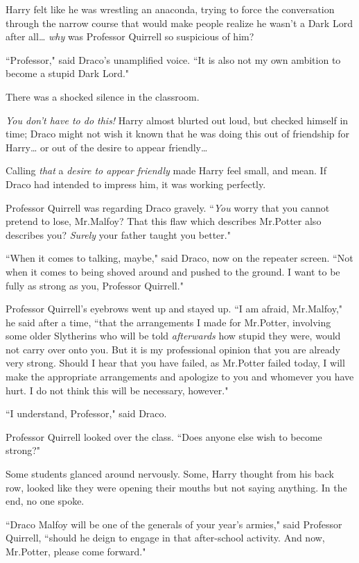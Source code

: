 Harry felt like he was wrestling an anaconda, trying to force the conversation through the narrow course that would make people realize he wasn't a Dark Lord after all{\ldots} \emph{why} was Professor Quirrell so suspicious of him?

``Professor," said Draco's unamplified voice. ``It is also not my own ambition to become a stupid Dark Lord."

There was a shocked silence in the classroom.

\emph{You don't have to do this!} Harry almost blurted out loud, but checked himself in time; Draco might not wish it known that he was doing this out of friendship for Harry{\ldots} or out of the desire to appear friendly{\ldots}

Calling \emph{that} a \emph{desire to appear friendly} made Harry feel small, and mean. If Draco had intended to impress him, it was working perfectly.

Professor Quirrell was regarding Draco gravely. ``\emph{You} worry that you cannot pretend to lose, Mr.\?Malfoy? That this flaw which describes Mr.\?Potter also describes you? \emph{Surely} your father taught you better."

``When it comes to talking, maybe," said Draco, now on the repeater screen. ``Not when it comes to being shoved around and pushed to the ground. I want to be fully as strong as you, Professor Quirrell."

Professor Quirrell's eyebrows went up and stayed up. ``I am afraid, Mr.\?Malfoy," he said after a time, ``that the arrangements I made for Mr.\?Potter, involving some older Slytherins who will be told \emph{afterwards} how stupid they were, would not carry over onto you. But it is my professional opinion that you are already very strong. Should I hear that you have failed, as Mr.\?Potter failed today, I will make the appropriate arrangements and apologize to you and whomever you have hurt. I do not think this will be necessary, however."

``I understand, Professor," said Draco.

Professor Quirrell looked over the class. ``Does anyone else wish to become strong?"

Some students glanced around nervously. Some, Harry thought from his back row, looked like they were opening their mouths but not saying anything. In the end, no one spoke.

``Draco Malfoy will be one of the generals of your year's armies," said Professor Quirrell, ``should he deign to engage in that after-school activity. And now, Mr.\?Potter, please come forward."

